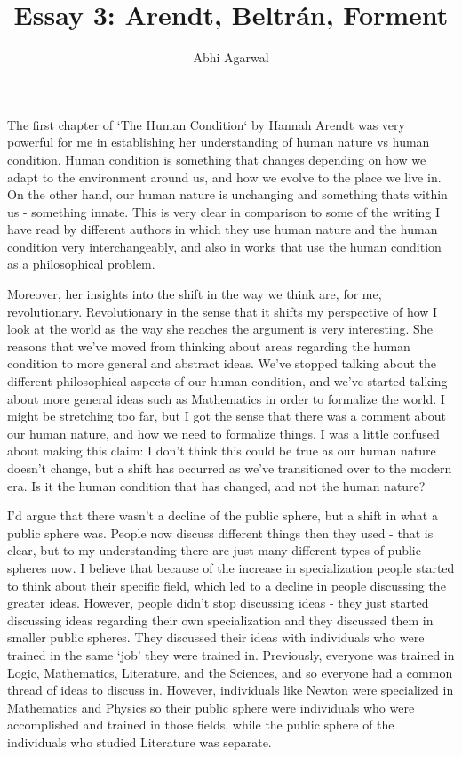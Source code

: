 \documentclass[11pt, oneside]{article}
\title{Essay 3: Arendt, Beltr\'an, Forment}
\author{Abhi Agarwal}
\date{}
\begin{document}
\maketitle

\par The first chapter of `The Human Condition` by Hannah Arendt was very powerful for me in establishing her understanding of human nature vs human condition. Human condition is something that changes depending on how we adapt to the environment around us, and how we evolve to the place we live in. On the other hand, our human nature is unchanging and something thats within us - something innate. This is very clear in comparison to some of the writing I have read by different authors in which they use human nature and the human condition very interchangeably, and also in works that use the human condition as a philosophical problem. 

\par Moreover, her insights into the shift in the way we think are, for me, revolutionary. Revolutionary in the sense that it shifts my perspective of how I look at the world as the way she reaches the argument is very interesting. She reasons that we've moved from thinking about areas regarding the human condition to more general and abstract ideas. We've stopped talking about the different philosophical aspects of our human condition, and we've started talking about more general ideas such as Mathematics in order to formalize the world. I might be stretching too far, but I got the sense that there was a comment about our human nature, and how we need to formalize things. I was a little confused about making this claim: I don't think this could be true as our human nature doesn't change, but a shift has occurred as we've transitioned over to the modern era. Is it the human condition that has changed, and not the human nature?

\par I'd argue that there wasn't a decline of the public sphere, but a shift in what a public sphere was. People now discuss different things then they used - that is clear, but to my understanding there are just many different types of public spheres now. I believe that because of the increase in specialization people started to think about their specific field, which led to a decline in people discussing the greater ideas. However, people didn't stop discussing ideas - they just started discussing ideas regarding their own specialization and they discussed them in smaller public spheres. They discussed their ideas with individuals who were trained in the same `job' they were trained in. Previously, everyone was trained in Logic, Mathematics, Literature, and the Sciences, and so everyone had a common thread of ideas to discuss in. However, individuals like Newton were specialized in Mathematics and Physics so their public sphere were individuals who were accomplished and trained in those fields, while the public sphere of the individuals who studied Literature was separate. 
\end{document}
